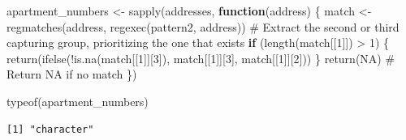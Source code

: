 \documentclass[
  12pt,
]{article}
\newenvironment{Shaded}{\begin{snugshade}}{\end{snugshade}}
\newcommand{\AttributeTok}[1]{\textcolor[rgb]{0.40,0.45,0.13}{#1}}
\newcommand{\CommentTok}[1]{\textcolor[rgb]{0.37,0.37,0.37}{#1}}
\newcommand{\ConstantTok}[1]{\textcolor[rgb]{0.56,0.35,0.01}{#1}}
\newcommand{\ControlFlowTok}[1]{\textcolor[rgb]{0.00,0.23,0.31}{\textbf{#1}}}
\newcommand{\DecValTok}[1]{\textcolor[rgb]{0.68,0.00,0.00}{#1}}
\newcommand{\DocumentationTok}[1]{\textcolor[rgb]{0.37,0.37,0.37}{\textit{#1}}}
\newcommand{\FunctionTok}[1]{\textcolor[rgb]{0.28,0.35,0.67}{#1}}
\newcommand{\NormalTok}[1]{\textcolor[rgb]{0.00,0.23,0.31}{#1}}
\newcommand{\OtherTok}[1]{\textcolor[rgb]{0.00,0.23,0.31}{#1}}
\newcommand{\SpecialCharTok}[1]{\textcolor[rgb]{0.37,0.37,0.37}{#1}}
\newcommand{\StringTok}[1]{\textcolor[rgb]{0.13,0.47,0.30}{#1}}
\begin{document}
\begin{Shaded}
\begin{Highlighting}[]
\NormalTok{apartment\_numbers }\OtherTok{\textless{}{-}} \FunctionTok{sapply}\NormalTok{(addresses, }\ControlFlowTok{function}\NormalTok{(address) \{}
\NormalTok{    match }\OtherTok{\textless{}{-}} \FunctionTok{regmatches}\NormalTok{(address, }\FunctionTok{regexec}\NormalTok{(pattern2, address))}
    \CommentTok{\# Extract the second or third capturing group, prioritizing the one that exists}
    \ControlFlowTok{if}\NormalTok{ (}\FunctionTok{length}\NormalTok{(match[[}\DecValTok{1}\NormalTok{]]) }\SpecialCharTok{\textgreater{}} \DecValTok{1}\NormalTok{) \{}
        \FunctionTok{return}\NormalTok{(}\FunctionTok{ifelse}\NormalTok{(}\SpecialCharTok{!}\FunctionTok{is.na}\NormalTok{(match[[}\DecValTok{1}\NormalTok{]][}\DecValTok{3}\NormalTok{]), match[[}\DecValTok{1}\NormalTok{]][}\DecValTok{3}\NormalTok{], match[[}\DecValTok{1}\NormalTok{]][}\DecValTok{2}\NormalTok{]))}
\NormalTok{    \}}
    \FunctionTok{return}\NormalTok{(}\ConstantTok{NA}\NormalTok{)  }\CommentTok{\# Return NA if no match}
\NormalTok{\})}

\FunctionTok{typeof}\NormalTok{(apartment\_numbers)}
\end{Highlighting}
\end{Shaded}

\begin{verbatim}
[1] "character"
\end{verbatim}

\begin{Shaded}
\end{Shaded}
\end{document}
